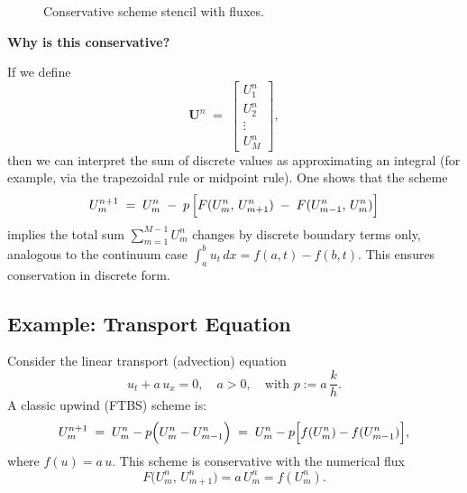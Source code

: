 \begin{figure}[H]
  \centering
  \caption{Conservative scheme stencil with fluxes.}
\end{figure}

\noindent
\textbf{Why is this conservative?}

If we define
\[
  \mathbf{U}^n
  \;=\;
  \begin{bmatrix}
    U_1^n  \\
    U_2^n  \\
    \vdots \\
    U_M^n
  \end{bmatrix},
\]
then we can interpret the sum of discrete values as approximating an integral (for example, via the trapezoidal rule or midpoint rule). One shows that the scheme
\[
  U_m^{n+1}
  \;=\;
  U_m^n
  \;-\;
  p\,\Bigl[
  F(U_m^n,\,U_{m+1}^n) \;-\; F(U_{m-1}^n,\,U_m^n)
  \Bigr]
\]
implies the total sum
\(\sum_{m=1}^{M-1} U_m^n\) changes by discrete boundary terms only, analogous to the continuum case
\(\int_a^b u_t\,dx = f(a,t) - f(b,t)\). This ensures conservation in discrete form.

\subsection{Example: Transport Equation}

Consider the linear transport (advection) equation
\[
  u_t + a\,u_x = 0,
  \quad a>0,
  \quad
  \text{with } p := a\,\frac{k}{h}.
\]
A classic upwind (FTBS) scheme is:
\[
  U_m^{n+1}
  \;=\;
  U_m^n - p\Bigl(U_m^n - U_{m-1}^n\Bigr)
  \;=\;
  U_m^n - p\Bigl[f(U_m^n) - f(U_{m-1}^n)\Bigr],
\]
where \(f(u) = a\,u\). This scheme is conservative with the numerical flux
\[
  F\bigl(U_m^n,\,U_{m+1}^n\bigr) = a\,U_m^n = f(U_m^n).
\]

